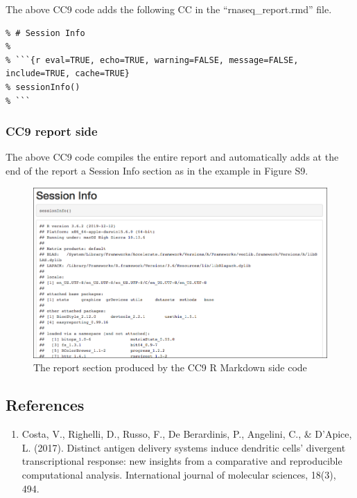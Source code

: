 \documentclass[]{article}
\providecommand{\tightlist}{%
  \setlength{\itemsep}{0pt}\setlength{\parskip}{0pt}}
\begin{document}
The above CC9 code adds the following CC in the ``rnaseq\_report.rmd''
file.

\begin{verbatim}
% # Session Info
% 
% ```{r eval=TRUE, echo=TRUE, warning=FALSE, message=FALSE, include=TRUE, cache=TRUE}
% sessionInfo()
% ```
\end{verbatim}

\hypertarget{cc9-report-side}{%
\subsubsection{CC9 report side}\label{cc9-report-side}}

The above CC9 code compiles the entire report and automatically adds at
the end of the report a Session Info section as in the example in Figure
S9.

\begin{figure}[ht]

{\centering \includegraphics[width=0.95\linewidth]{imgs/9} 

}

\caption{The report section produced by the CC9 R Markdown side code}\label{fig:unnamed-chunk-20}
\end{figure}

\hypertarget{references}{%
\subsection{References}\label{references}}

\begin{enumerate}
\def\labelenumi{\arabic{enumi}.}
\tightlist
\item
  Costa, V., Righelli, D., Russo, F., De Berardinis, P., Angelini, C.,
  \& D'Apice, L. (2017). Distinct antigen delivery systems induce
  dendritic cells' divergent transcriptional response: new insights from
  a comparative and reproducible computational analysis. International
  journal of molecular sciences, 18(3), 494.
\end{enumerate}
\end{document}

